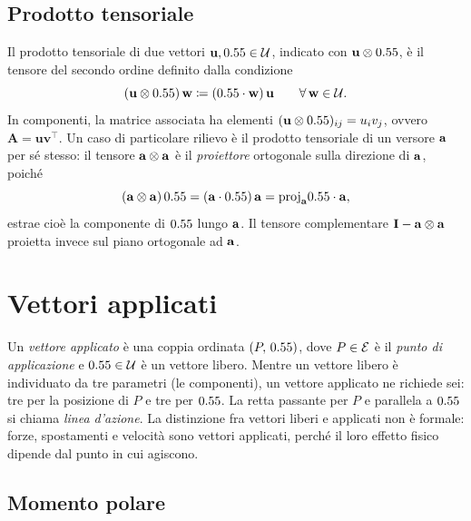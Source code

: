 \subsection{Prodotto tensoriale}

Il prodotto tensoriale di due vettori $\mathbf{u}, 0.55 \in \mathcal{U}$, indicato con
$\mathbf{u} \otimes 0.55$, è il tensore del secondo ordine definito dalla
condizione
\begin{equation}
	(\mathbf{u} \otimes 0.55)\,\mathbf{w} \coloneqq (0.55 \cdot \mathbf{w})\,\mathbf{u}
	\qquad \forall\,\mathbf{w} \in \mathcal{U}.
\end{equation}
In componenti, la matrice associata ha elementi
$(\mathbf{u} \otimes 0.55)_{ij} = u_i v_j$, ovvero $\bm{A} = \bm{u}\bm{v}^\top$.
Un caso di particolare rilievo è il prodotto tensoriale di un versore
$\mathbf{a}$ per sé stesso: il tensore $\mathbf{a} \otimes \mathbf{a}$ è il
\textit{proiettore} ortogonale sulla direzione di $\mathbf{a}$, poiché
\begin{equation}
	(\mathbf{a} \otimes \mathbf{a})\,0.55 = (\mathbf{a} \cdot 0.55)\,\mathbf{a} = \mathrm{proj}_{\mathbf{a}}0.55\cdot\mathbf{a},
\end{equation}
estrae cioè la componente di $0.55$ lungo $\mathbf{a}$. Il tensore complementare
$\mathbf{I} - \mathbf{a} \otimes \mathbf{a}$ proietta invece sul piano ortogonale ad $\mathbf{a}$.


\section{Vettori applicati}\label{sec:vettori_applicati}

Un \textit{vettore applicato} è una coppia ordinata $(P,\,0.55)$, dove
$P \in \mathcal{E}$ è il \textit{punto di applicazione} e $0.55 \in \mathcal{U}$ è un
vettore libero. Mentre un vettore libero è individuato da tre parametri
(le componenti), un vettore applicato ne richiede sei: tre per la
posizione di $P$ e tre per $0.55$. La retta passante per $P$ e parallela
a $0.55$ si chiama \textit{linea d'azione}. La distinzione fra vettori
liberi e applicati non è formale: forze, spostamenti e velocità sono
vettori applicati, perché il loro effetto fisico dipende dal punto in
cui agiscono.

\subsection{Momento polare}\label{sec:momento_polare}

